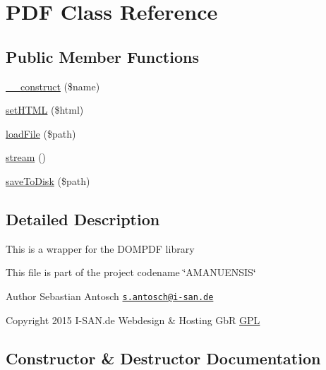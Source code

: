 \hypertarget{class_p_d_f}{}\section{P\+D\+F Class Reference}
\label{class_p_d_f}
\subsection*{Public Member Functions}
\begin{DoxyCompactItemize}
\item 
\hyperlink{class_p_d_f_a4717bbfc70a40a57ee741ed70766c309}{\+\_\+\+\_\+construct} (\$name)
\item 
\hyperlink{class_p_d_f_aaa214328de3363603766a57ab67db132}{set\+H\+T\+M\+L} (\$html)
\item 
\hyperlink{class_p_d_f_a22ebf8f5c082966db9de48260a15d309}{load\+File} (\$path)
\item 
\hyperlink{class_p_d_f_a38772d5d7a8e46605d949882eeae01bd}{stream} ()
\item 
\hyperlink{class_p_d_f_aa56055584dd48147c349a2c91ffca5f0}{save\+To\+Disk} (\$path)
\end{DoxyCompactItemize}


\subsection{Detailed Description}
This is a wrapper for the D\+O\+M\+P\+D\+F library

This file is part of the project codename \char`\"{}\+A\+M\+A\+N\+U\+E\+N\+S\+I\+S\char`\"{}

\begin{DoxyAuthor}{Author}
Sebastian Antosch \href{mailto:s.antosch@i-san.de}{\tt s.\+antosch@i-\/san.\+de} 
\end{DoxyAuthor}
\begin{DoxyCopyright}{Copyright}
2015 I-\/\+S\+A\+N.\+de Webdesign \& Hosting Gb\+R \hyperlink{}{G\+P\+L }
\end{DoxyCopyright}


\subsection{Constructor \& Destructor Documentation}
\hypertarget{class_p_d_f_a4717bbfc70a40a57ee741ed70766c309}{}
